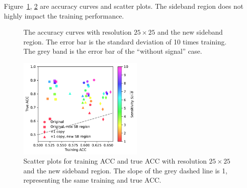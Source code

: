 \documentclass[12pt]{article}
\begin{document}
        Figure~\ref{fig:acc_curve_new_SB_region}, \ref{fig:acc_scatter_new_SB_region} are accuracy curves and scatter plots. The sideband region does not highly impact the training performance.
        \begin{figure}[htpb]
            \centering
            \caption{The accuracy curves with resolution $25\times 25$ and the new sideband region. The error bar is the standard deviation of 10 times training. The grey band is the error bar of the ``without signal'' case.}
            \label{fig:acc_curve_new_SB_region}
        \end{figure}
        \begin{figure}[htpb]
            \centering
            \includegraphics[width=0.55\textwidth]{HVmodel_training_true_acc_origin_copy_1_res_25_new_SB.pdf}
            \caption{Scatter plots for training ACC and true ACC with resolution $25\times 25$ and the new sideband region. The slope of the grey dashed line is 1, representing the same training and true ACC.}
            \label{fig:acc_scatter_new_SB_region}
        \end{figure}
\end{document}
